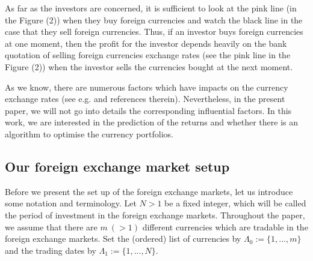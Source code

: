 \documentclass[11pt]{article}
\numberwithin{equation}{section}
\begin{document}
As far as the  investors are concerned,   it is sufficient to look at the pink line (in the Figure (2))  when they buy foreign currencies and watch the black line in the case that they sell foreign currencies. Thus, if an  investor buys foreign currencies at one moment, then the profit for the investor depends heavily on the bank quotation of selling foreign currencies exchange rates (see the pink line in the Figure (2)) when the investor sells the currencies bought at the next moment. 

As we know, there are numerous factors which have impacts on the currency exchange rates (see e.g. \cite{PanpanRenWu} and references therein). Nevertheless, in the present paper, we will not go into 
details the corresponding influential factors.  In this work, we are interested in  the prediction of the returns and  whether there is an algorithm to optimise the currency portfolios.

\subsection{Our foreign exchange market setup}
Before we present the set up of the foreign exchange markets, let us introduce some notation  and terminology. Let $N>1$ be a fixed integer, which will be called the period of investment in the foreign exchange markets. Throughout the paper, we assume that there are $m~ (>1)$ different currencies which are tradable in the foreign exchange markets. Set the (ordered) list of currencies by $\Lambda_0:=\{1,...,m\}$ and 
the trading dates by $\Lambda_1:=\{1,...,N\}$.
\end{document}
